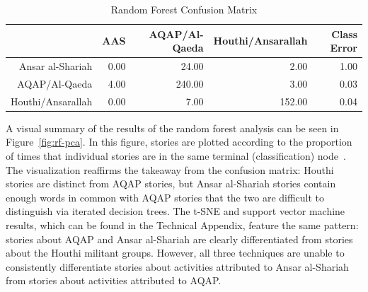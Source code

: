 \begin{table}[ht]
 \centering
 \begin{tabular}{rrrrr}
   \hline
  & AAS & AQAP/Al-Qaeda & Houthi/Ansarallah & Class Error \\
   \hline
 Ansar al-Shariah & 0.00 & 24.00 & 2.00 & 1.00 \\
   AQAP/Al-Qaeda & 4.00 & 240.00 & 3.00 & 0.03 \\
   Houthi/Ansarallah & 0.00 & 7.00 & 152.00 & 0.04 \\
    \hline
 \end{tabular}
 \caption{Random Forest Confusion Matrix}
\label{tab:ref-conf}
 \end{table}
 
A visual summary of the results of the random forest analysis can be seen in Figure~\ref{fig:rf-pca}. In this figure, stories are plotted according to the proportion of times that individual stories are in the same terminal (classification) node~\autocite{jones2015exploratory}.  The visualization reaffirms the takeaway from the confusion matrix: Houthi stories are distinct from AQAP stories, but Ansar al-Shariah stories contain enough words in common with AQAP stories that the two are difficult to distinguish via iterated decision trees. The t-SNE and support vector machine results, which can be found in the Technical Appendix, feature the same pattern: stories about AQAP and Ansar al-Shariah are clearly differentiated from stories about the Houthi militant groups. However, all three techniques are unable to consistently differentiate stories about activities attributed to Ansar al-Shariah from stories about activities attributed to AQAP. 

